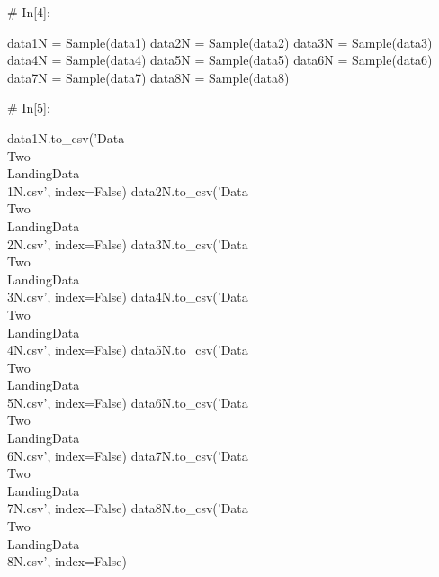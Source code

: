 \documentclass{MathorCupModeling}
\begin{document}
\begin{python}
# In[4]:


data1N = Sample(data1)
data2N = Sample(data2)
data3N = Sample(data3)
data4N = Sample(data4)
data5N = Sample(data5)
data6N = Sample(data6)
data7N = Sample(data7)
data8N = Sample(data8)


# In[5]:


data1N.to_csv('Data\\Two\\LandingData\\1N.csv', index=False)
data2N.to_csv('Data\\Two\\LandingData\\2N.csv', index=False)
data3N.to_csv('Data\\Two\\LandingData\\3N.csv', index=False)
data4N.to_csv('Data\\Two\\LandingData\\4N.csv', index=False)
data5N.to_csv('Data\\Two\\LandingData\\5N.csv', index=False)
data6N.to_csv('Data\\Two\\LandingData\\6N.csv', index=False)
data7N.to_csv('Data\\Two\\LandingData\\7N.csv', index=False)
data8N.to_csv('Data\\Two\\LandingData\\8N.csv', index=False)


\end{python}
\end{document}
